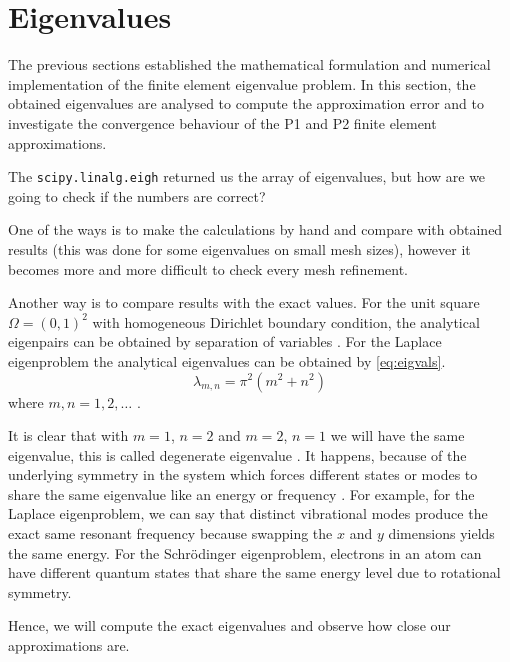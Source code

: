 \documentclass[conference]{IEEEtran}
\begin{document}
\section{Eigenvalues}
The previous sections established the mathematical formulation and numerical implementation of the finite element eigenvalue problem. In this section, the obtained eigenvalues are analysed to compute the approximation error and to investigate the convergence behaviour of the P1 and P2 finite element approximations.

The \texttt{scipy.linalg.eigh} returned us the array of eigenvalues, but how are we going to check if the numbers are correct? 

One of the ways is to make the calculations by hand and compare with obtained results (this was done for some eigenvalues on small mesh sizes), however it becomes more and more difficult to check every mesh refinement.

Another way is to compare results with the exact values. For the unit square $\Omega = (0, 1)^2$ with homogeneous Dirichlet boundary condition, the analytical eigenpairs can be obtained by separation of variables \cite{b12.1} \cite{b24}. For the Laplace eigenproblem the analytical eigenvalues can be obtained by \ref{eq:eigvals}.
\begin{equation}
    \lambda_{m,n} = \pi^2(m^2 + n^2)
    \label{eq:eigvals}
\end{equation}
where $m, n = 1, 2, \ldots$ \cite{b24}.

It is clear that with $m=1$, $n=2$ and $m=2$, $n=1$ we will have the same eigenvalue, this is called degenerate eigenvalue \cite{b12.4} \cite{b24}. It happens, because of the underlying symmetry in the system which forces different states or modes to share the same eigenvalue like an energy or frequency \cite{b25}. For example, for the Laplace eigenproblem, we can say that distinct vibrational modes produce the exact same resonant frequency because swapping the $x$ and $y$ dimensions yields the same energy.
For the Schr\"{o}dinger eigenproblem, electrons in an atom can have different quantum states that share the same energy level due to rotational symmetry.

Hence, we will compute the exact eigenvalues and observe how close our approximations are.
\end{document}
